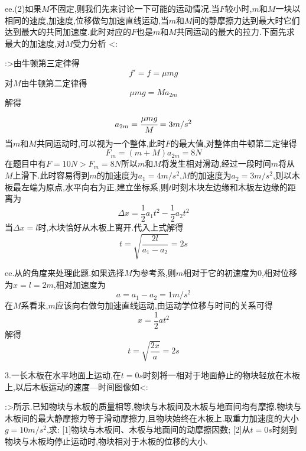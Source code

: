 \begin{calculate}
ee.(2)如果$M$不固定,则我们先来讨论一下可能的运动情况.当$F$较小时,$m$和$M$一块以相同的速度,加速度,位移做匀加速直线运动,当$m$和$M$间的静摩擦力达到最大时它们达到最大的共同加速度.此时对应的$F$也是$m$和$M$共同运动的最大的拉力.下面先求最大的加速度,对$M$受力分析
<:
:>由牛顿第三定律得
\[
  f'=f=\mu mg
\]
对$M$由牛顿第二定律得
\[
  \mu mg = Ma_{2m}
\]
解得
\[
  a_{2m}=\cfrac{\mu mg}{M}=3m/s^2
\]
当$m$和$M$共同运动时,可以视为一个整体,此时$F$的最大值,对整体由牛顿第二定律得
\[
  F_m=(m+M)a_{2m}=8N
\]
在题目中有$F=10N>F_m=8N$所以$m$和$M$将发生相对滑动,经过一段时间$m$将从$M$上滑下.此时容易得到$m$的加速度为$a_1=4m/s^2$,$M$的加速度为$a_2=3m/s^2$,则以木板最左端为原点,水平向右为正,建立坐标系,则$t$时刻木块左边缘和木板左边缘的距离为
\[
  \Delta x=\frac{1}{2}a_1t^2-\frac{1}{2}a_2t^2
\]
当$\Delta x=l$时,木块恰好从木板上离开.代入上式解得
\[
  t=\sqrt{\frac{2l}{a_1-a_2}}=2s
\]

ee.从的角度来处理此题.如果选择$M$为参考系,则$m$相对于它的初速度为$0$,相对位移为$x=l=2m$,相对加速度为
\[
  a=a_1-a_2=1m/s^2
\]
在$M$系看来,$m$应该向右做匀加速直线运动,由运动学位移与时间的关系可得
\[
  x=\frac{1}{2}at^2
\]
解得
\[
  t=\sqrt{\frac{2x}{a}}=2s
\]

3.一长木板在水平地面上运动,在$t=0s$时刻将一相对于地面静止的物块轻放在木板上,以后木板运动的速度---时间图像如<:
:>所示.已知物块与木板的质量相等,物块与木板间及木板与地面间均有摩擦.物块与木板间的最大静摩擦力等于滑动摩擦力,且物块始终在木板上.取重力加速度的大小$g=10m/s^2$,求:
[1]物块与木板间、木板与地面间的动摩擦因数;
[2]从$t=0s$时刻到物块与木板均停止运动时,物块相对于木板的位移的大小.


\end{calculate}
